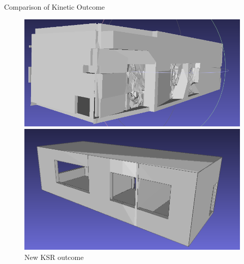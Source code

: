 \documentclass[10pt]{beamer}
\begin{document}
\begin{frame}{Comparison of Kinetic Outcome}
    \begin{figure}
      \centering
      \begin{minipage}[b]{0.48\textwidth}
        \centering
        \includegraphics[width=\textwidth]{../image/3zones_v2_1.png}
        \caption{Old KSR outcome}
      \end{minipage}
      \hfill
      \begin{minipage}[b]{0.48\textwidth}
        \centering
        \includegraphics[width=\textwidth]{../image/3zones_final.png}
        \caption{New KSR outcome}
      \end{minipage}
    \end{figure}
\end{frame}
\end{document}
